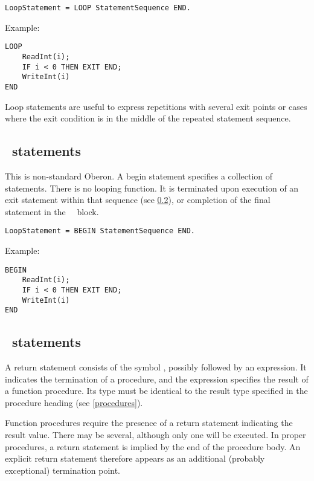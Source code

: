 \documentclass[12pt]{article}
\begin{document}
\begin{lstlisting}[style=example]
LoopStatement = LOOP StatementSequence END.
\end{lstlisting} 

Example:
\begin{lstlisting}[style=example]
LOOP
    ReadInt(i);
    IF i < 0 THEN EXIT END; 
    WriteInt(i)
END
\end{lstlisting} 

Loop statements are useful to express repetitions with several exit points or cases where the exit condition is in the middle of the repeated statement sequence.

\subsection{\BEGIN\ statements}

This is non-standard Oberon. A begin statement specifies a collection of statements. There is no looping function.  It is terminated upon execution of an exit statement within that sequence (see \ref{return}), or completion of the final statement in the \BEGIN\ \END\ block.

\begin{lstlisting}[style=example]
LoopStatement = BEGIN StatementSequence END.
\end{lstlisting} 

Example:
\begin{lstlisting}[style=example]
BEGIN
    ReadInt(i);
    IF i < 0 THEN EXIT END; 
    WriteInt(i)
END
\end{lstlisting} 

\subsection{\RETURN\ statements}
\label{return}

A return statement consists of the symbol \RETURN, possibly followed by an expression. It indicates the termination of a procedure, and the expression specifies the result of a function procedure. Its type must be identical to the result type specified in the procedure heading (see \ref{procedures}).

Function procedures require the presence of a return statement indicating the result value. There may be several, although only one will be executed. In proper procedures, a return statement is implied by the end of the procedure body. An explicit return statement therefore appears as an additional (probably exceptional) termination point.
\end{document}
